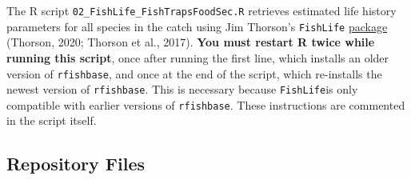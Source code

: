 \documentclass[
]{article}
\begin{document}
The R script \texttt{02\_FishLife\_FishTrapsFoodSec.R} retrieves
estimated life history parameters for all species in the catch using Jim
Thorson's \texttt{FishLife}
\href{https://github.com/James-Thorson-NOAA/FishLife}{package} (Thorson,
2020; Thorson et al., 2017). \textbf{You must restart R twice while
running this script}, once after running the first line, which installs
an older version of \texttt{rfishbase}, and once at the end of the
script, which re-installs the newest version of \texttt{rfishbase}. This
is necessary because \texttt{FishLife}is only compatible with earlier
versions of \texttt{rfishbase}. These instructions are commented in the
script itself.

\hypertarget{repository-files}{%
\subsection{Repository Files}\label{repository-files}}
\end{document}
